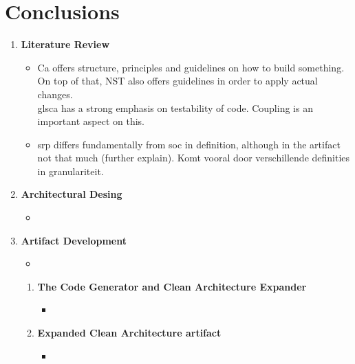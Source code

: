 \chapter{Conclusions} \label{chap_conclusions}

\begin{enumerate}
    \color{red}

    \item \textbf{Literature Review} \\
    \begin{itemize}
        \item Ca offers structure, principles and guidelines on how to build something. On top
        of that, NST also offers guidelines in order to apply actual changes.
        \\gls{ca} has a strong emphasis on testability of code. Coupling is an important
        aspect on this.
        \item \gls{srp} differs fundamentally from \gls{soc} in definition, although in
        the artifact not that much (further explain). Komt vooral door verschillende
        definities in granulariteit.
    \end{itemize}
    
    \item \textbf{Architectural Desing} \\
    \begin{itemize}
        \item 
    \end{itemize}

    \item \textbf{Artifact Development} \\
    \begin{itemize}
        \item 
    \end{itemize}
    \begin{enumerate}[label*={\arabic*.}]
        
        \item \textbf{The Code Generator and Clean Architecture Expander} \\
        \begin{itemize}
            \item 
        \end{itemize}
        
        \item \textbf{Expanded Clean Architecture artifact} \\
        \begin{itemize}
            \item 
        \end{itemize}
        

\end{enumerate}
\end{enumerate}
